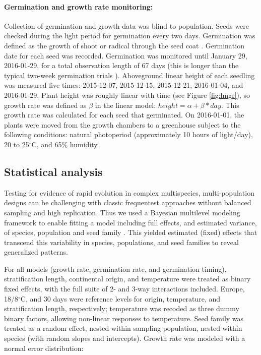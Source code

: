\documentclass[12pt]{article}\usepackage[]{graphicx}\usepackage[]{color}
\begin{document}
	\paragraph{Germination and growth rate monitoring:}  Collection of germination and growth data was blind to population. Seeds were checked during the light period for germination every two days. Germination was defined as the growth of shoot or radical through the seed coat \parencite{Baskin1998,Popay1970}. Germination date for each seed was recorded.  Germination was monitored until January 29, 2016-01-29, for a total observation length of 67 days (this is longer than the typical two-week germination trials \parencite{Baskin1998,Wulff1994}). Aboveground linear height of each seedling was measured five times: 2015-12-07, 2015-12-15, 2015-12-21, 2016-01-04, and 2016-01-29. Plant height was roughly linear with time (see Figure \ref{fig:lmgr}), so growth rate was defined as $\beta$ in the linear model: $height = \alpha + \beta*day $. This growth rate was calculated for each seed that germinated. On 2016-01-01, the plants were moved from the growth chambers to a greenhouse subject to the following conditions: natural photoperiod (approximately 10 hours of light/day), 20 to 25$^\circ$C, and 65\% humidity.
	\subsection{Statistical analysis} %
	Testing for evidence of rapid evolution in complex multispecies, multi-population designs can be challenging with classic frequentest approaches without balanced sampling and high replication. Thus we used a Bayesian multilevel modeling framework to enable fitting a model including full effects, and estimated variance, of species, population and seed family \parencite{Carpenter2017}. This yielded estimated (fixed) effects that transcend this variability in species, populations, and seed families to reveal generalized patterns. 

For all models (growth rate, germination rate, and germination timing), stratification length, continental origin, and temperature were treated as binary fixed effects, with the full suite of 2- and 3-way interactions included. Europe, 18/8$^\circ$C, and 30 days were reference levels for origin, temperature, and stratification length, respectively; temperature was recoded as three dummy binary factors, allowing non-linear responses to temperature. Seed family was treated as a random effect, nested within sampling population, nested within species (with random slopes and intercepts). Growth rate was modeled with a normal error distribution: 
\end{document}
